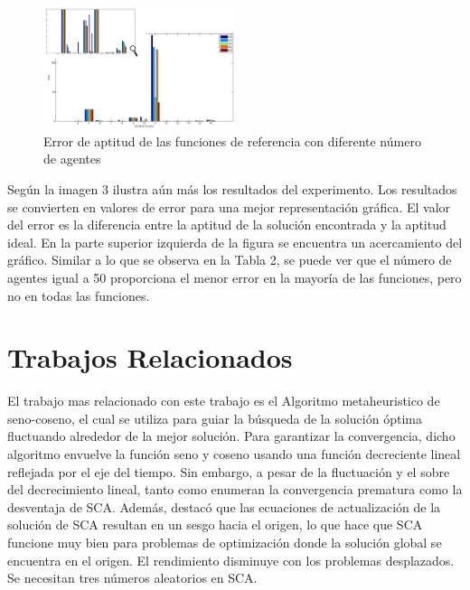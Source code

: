 \documentclass[conference]{IEEEtran}
\begin{document}
\begin{figure}[h!]
    \centering
    \includegraphics[width=0.5\textwidth, keepaspectratio]{Figures/image3.png}
    \caption{Error de aptitud de las funciones de referencia con diferente
        número de agentes
        \cite{aziz2022}}
    \label{fig:mi_etiqueta}
\end{figure}

Según \cite{aziz2022} la imagen 3 ilustra aún más los resultados del experimento. Los resultados se
convierten en valores de error para una mejor representación gráfica. El valor
del error es la diferencia entre la aptitud de la solución encontrada y la
aptitud ideal. En la parte superior izquierda de la figura se encuentra un
acercamiento del gráfico. Similar a lo que se observa en la Tabla 2, se puede
ver que el número de agentes igual a 50 proporciona el menor error en la
mayoría de las funciones, pero no en todas las funciones.

\section{Trabajos Relacionados}
\label{sec:TR}

El trabajo mas relacionado con este trabajo es el Algoritmo metaheuristico de
seno-coseno, el cual se utiliza para guiar la búsqueda de la solución
óptima fluctuando alrededor de la mejor solución. Para garantizar la
convergencia, dicho algoritmo envuelve la función seno y coseno usando una
función
decreciente lineal reflejada por el eje del tiempo. Sin embargo, a pesar de la
fluctuación y el sobre del decrecimiento lineal, tanto
\cite{abualigah2021advances} como \cite{gabis2021comprehensive} enumeran
la convergencia prematura como la desventaja de SCA. Además,
\cite{askari2020critical} destacó que
las ecuaciones de actualización de la solución de SCA resultan en un sesgo
hacia el origen, lo que hace que SCA funcione muy bien para problemas de
optimización donde la solución global se encuentra en el origen.
El rendimiento disminuye con los problemas desplazados. Se necesitan tres
números aleatorios en SCA.
\end{document}
